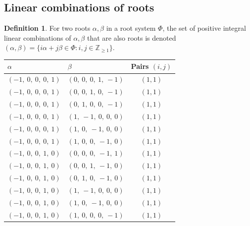 \documentclass[11pt]{article}
\theoremstyle{definition}
\newtheorem{definition}{Definition}[section]
\begin{document}
\subsection{Linear combinations of roots}

\begin{definition}
For two roots $\alpha, \beta$ in a root system $\Phi$, the set of positive integral linear combinations of $\alpha, \beta$ that are also roots is denoted
\(
	(\alpha, \beta) = \{ i \alpha + j \beta \in \Phi : i, j \in \mathbb{Z}_{\ge 1} \}
\).
\end{definition}

\begin{tabular}{|l|l|c|}
    \hline
    $\alpha$ & $\beta$ & Pairs $(i,j)$ \\
    \hline
    $\left( -1, \  0, \  0, \  0, \  1\right)$ & $\left( 0, \  0, \  0, \  1, \  -1\right)$ & $(1,1)$ \\
    \hline
    $\left( -1, \  0, \  0, \  0, \  1\right)$ & $\left( 0, \  0, \  1, \  0, \  -1\right)$ & $(1,1)$ \\
    \hline
    $\left( -1, \  0, \  0, \  0, \  1\right)$ & $\left( 0, \  1, \  0, \  0, \  -1\right)$ & $(1,1)$ \\
    \hline
    $\left( -1, \  0, \  0, \  0, \  1\right)$ & $\left( 1, \  -1, \  0, \  0, \  0\right)$ & $(1,1)$ \\
    \hline
    $\left( -1, \  0, \  0, \  0, \  1\right)$ & $\left( 1, \  0, \  -1, \  0, \  0\right)$ & $(1,1)$ \\
    \hline
    $\left( -1, \  0, \  0, \  0, \  1\right)$ & $\left( 1, \  0, \  0, \  -1, \  0\right)$ & $(1,1)$ \\
    \hline
    $\left( -1, \  0, \  0, \  1, \  0\right)$ & $\left( 0, \  0, \  0, \  -1, \  1\right)$ & $(1,1)$ \\
    \hline
    $\left( -1, \  0, \  0, \  1, \  0\right)$ & $\left( 0, \  0, \  1, \  -1, \  0\right)$ & $(1,1)$ \\
    \hline
    $\left( -1, \  0, \  0, \  1, \  0\right)$ & $\left( 0, \  1, \  0, \  -1, \  0\right)$ & $(1,1)$ \\
    \hline
    $\left( -1, \  0, \  0, \  1, \  0\right)$ & $\left( 1, \  -1, \  0, \  0, \  0\right)$ & $(1,1)$ \\
    \hline
    $\left( -1, \  0, \  0, \  1, \  0\right)$ & $\left( 1, \  0, \  -1, \  0, \  0\right)$ & $(1,1)$ \\
    \hline
    $\left( -1, \  0, \  0, \  1, \  0\right)$ & $\left( 1, \  0, \  0, \  0, \  -1\right)$ & $(1,1)$ \\

\end{tabular}
\end{document}
